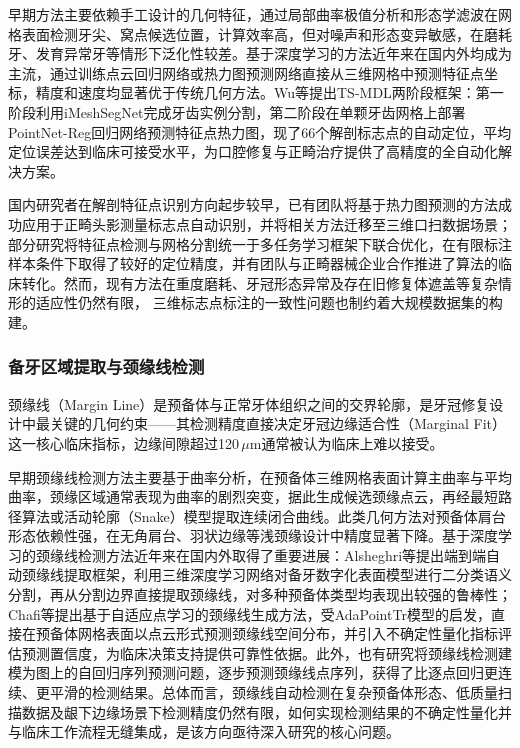 \documentclass[12pt,hyperref,a4paper,UTF8]{ctexart}
\begin{document}
早期方法主要依赖手工设计的几何特征，通过局部曲率极值分析和形态学滤波在网格表面检测牙尖、窝点候选位置，计算效率高，但对噪声和形态变异敏感，在磨耗牙、发育异常牙等情形下泛化性较差。基于深度学习的方法近年来在国内外均成为主流，通过训练点云回归网络或热力图预测网络直接从三维网格中预测特征点坐标，精度和速度均显著优于传统几何方法。Wu等\cite{wu2022two}提出TS-MDL两阶段框架：第一阶段利用iMeshSegNet完成牙齿实例分割，第二阶段在单颗牙齿网格上部署PointNet-Reg回归网络预测特征点热力图，现了66个解剖标志点的自动定位，平均定位误差达到临床可接受水平，为口腔修复与正畸治疗提供了高精度的全自动化解决方案。

国内研究者在解剖特征点识别方向起步较早，已有团队将基于热力图预测的方法成功应用于正畸头影测量标志点自动识别，并将相关方法迁移至三维口扫数据场景；部分研究将特征点检测与网格分割统一于多任务学习框架下联合优化，在有限标注样本条件下取得了较好的定位精度，并有团队与正畸器械企业合作推进了算法的临床转化。然而，现有方法在重度磨耗、牙冠形态异常及存在旧修复体遮盖等复杂情形的适应性仍然有限，
三维标志点标注的一致性问题也制约着大规模数据集的构建。

\subsubsection{备牙区域提取与颈缘线检测}

颈缘线（Margin Line）是预备体与正常牙体组织之间的交界轮廓，是牙冠修复设计中最关键的几何约束——其检测精度直接决定牙冠边缘适合性（Marginal Fit）这一核心临床指标，边缘间隙超过120\,$\mu$m通常被认为临床上难以接受。

早期颈缘线检测方法主要基于曲率分析，在预备体三维网格表面计算主曲率与平均曲率，颈缘区域通常表现为曲率的剧烈突变，据此生成候选颈缘点云，再经最短路径算法或活动轮廓（Snake）模型提取连续闭合曲线。此类几何方法对预备体肩台形态依赖性强，在无角肩台、羽状边缘等浅颈缘设计中精度显著下降。基于深度学习的颈缘线检测方法近年来在国内外取得了重要进展：Alsheghri等\cite{alsheghri2025automatic}提出端到端自动颈缘线提取框架，利用三维深度学习网络对备牙数字化表面模型进行二分类语义分割，再从分割边界直接提取颈缘线，对多种预备体类型均表现出较强的鲁棒性；Chafi等\cite{alsheghri2024adaptive}提出基于自适应点学习的颈缘线生成方法，受AdaPointTr模型的启发，直接在预备体网格表面以点云形式预测颈缘线空间分布，并引入不确定性量化指标评估预测置信度，为临床决策支持提供可靠性依据。此外，也有研究将颈缘线检测建模为图上的自回归序列预测问题，逐步预测颈缘线点序列，获得了比逐点回归更连续、更平滑的检测结果。总体而言，颈缘线自动检测在复杂预备体形态、低质量扫描数据及龈下边缘场景下检测精度仍然有限，如何实现检测结果的不确定性量化并与临床工作流程无缝集成，是该方向亟待深入研究的核心问题。
\end{document}
